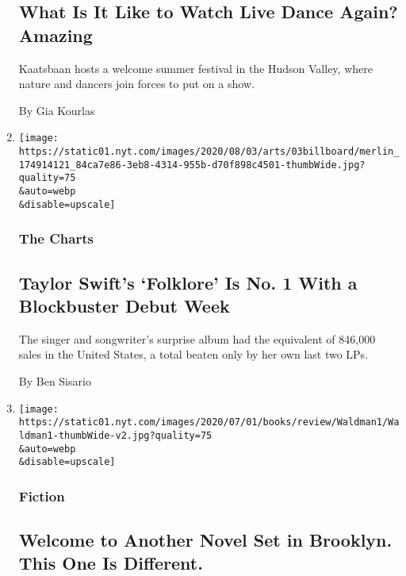 \begin{enumerate}
  \hypertarget{what-is-it-like-to-watch-live-dance-again-amazing}{%
  \subsection{What Is It Like to Watch Live Dance Again?
  Amazing}\label{what-is-it-like-to-watch-live-dance-again-amazing}}

  Kaatsbaan hosts a welcome summer festival in the Hudson Valley, where
  nature and dancers join forces to put on a show.

  By Gia Kourlas
\item
  \href{/2020/08/03/arts/music/taylor-swift-folklore-billboard-chart.html}{}

  \texttt{[image: https://static01.nyt.com/images/2020/08/03/arts/03billboard/merlin\_174914121\_84ca7e86-3eb8-4314-955b-d70f898c4501-thumbWide.jpg?quality=75\\\&auto=webp\\\&disable=upscale]}

  \hypertarget{the-charts}{%
  \subsubsection{The Charts}\label{the-charts}}

  \hypertarget{taylor-swifts-folklore-is-no-1-with-a-blockbuster-debut-week}{%
  \subsection{Taylor Swift's `Folklore' Is No. 1 With a Blockbuster
  Debut
  Week}\label{taylor-swifts-folklore-is-no-1-with-a-blockbuster-debut-week}}

  The singer and songwriter's surprise album had the equivalent of
  846,000 sales in the United States, a total beaten only by her own
  last two LPs.

  By Ben Sisario
\item
  \href{/2020/08/03/books/review/kings-county-david-goodwillie.html}{}

  \texttt{[image: https://static01.nyt.com/images/2020/07/01/books/review/Waldman1/Waldman1-thumbWide-v2.jpg?quality=75\\\&auto=webp\\\&disable=upscale]}

  \hypertarget{fiction}{%
  \subsubsection{Fiction}\label{fiction}}

  \hypertarget{welcome-to-another-novel-set-in-brooklyn-this-one-is-different}{%
  \subsection{Welcome to Another Novel Set in Brooklyn. This One Is
  Different.}\label{welcome-to-another-novel-set-in-brooklyn-this-one-is-different}}


\end{enumerate}
